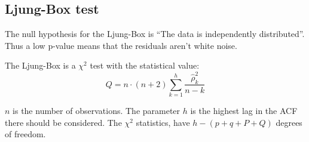 \subsection{Ljung-Box test}

The null hypothesis for the Ljung-Box is ``The data is independently distributed''. Thus a low p-value means that the residuals aren't white noise.

The Ljung-Box is a $\chi^2$ test with the statistical value:
\begin{equation}
Q = n \cdot (n + 2) \sum_{k=1}^h \frac{\hat{\rho}_k^2}{n - k}
\end{equation}

$n$ is the number of observations. The parameter $h$ is the highest lag in the ACF there should be considered. The $\chi^2$ statistics, have $h - (p + q + P + Q)$ degrees of freedom.
